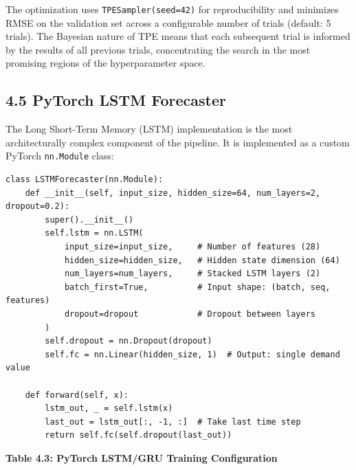 \documentclass[12pt, a4paper]{report}
\begin{document}
The optimization uses \texttt{TPESampler(seed=42)} for reproducibility and minimizes RMSE on the validation set across a configurable number of trials (default: 5 trials). The Bayesian nature of TPE means that each subsequent trial is informed by the results of all previous trials, concentrating the search in the most promising regions of the hyperparameter space.

\subsection{4.5 PyTorch LSTM Forecaster}

The Long Short-Term Memory (LSTM) implementation is the most architecturally complex component of the pipeline. It is implemented as a custom PyTorch \texttt{nn.Module} class:

\begin{verbatim}
class LSTMForecaster(nn.Module):
    def __init__(self, input_size, hidden_size=64, num_layers=2, dropout=0.2):
        super().__init__()
        self.lstm = nn.LSTM(
            input_size=input_size,     # Number of features (28)
            hidden_size=hidden_size,   # Hidden state dimension (64)
            num_layers=num_layers,     # Stacked LSTM layers (2)
            batch_first=True,          # Input shape: (batch, seq, features)
            dropout=dropout            # Dropout between layers
        )
        self.dropout = nn.Dropout(dropout)
        self.fc = nn.Linear(hidden_size, 1)  # Output: single demand value

    def forward(self, x):
        lstm_out, _ = self.lstm(x)
        last_out = lstm_out[:, -1, :]  # Take last time step
        return self.fc(self.dropout(last_out))
\end{verbatim}

\textbf{Table 4.3: PyTorch LSTM/GRU Training Configuration}
\end{document}
